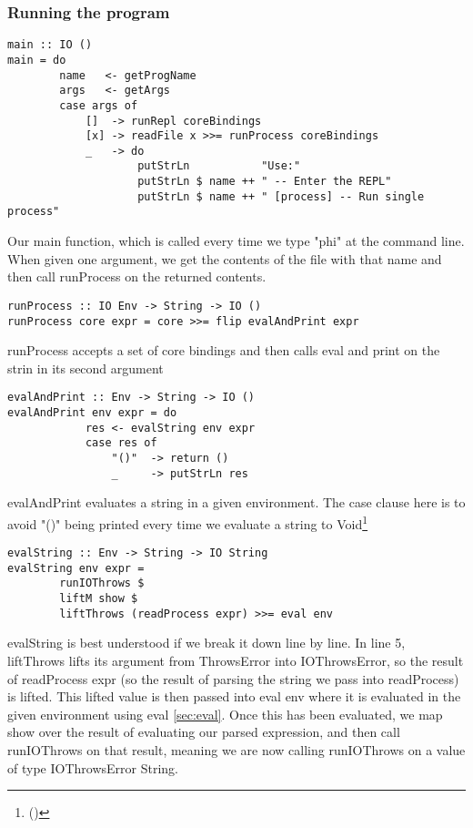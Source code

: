 \subsubsection{Running the program}
\begin{verbatim}
main :: IO ()
main = do
        name   <- getProgName
        args   <- getArgs
        case args of
            []  -> runRepl coreBindings
            [x] -> readFile x >>= runProcess coreBindings 
            _   -> do
                    putStrLn           "Use:"
                    putStrLn $ name ++ " -- Enter the REPL"
                    putStrLn $ name ++ " [process] -- Run single process"
\end{verbatim}

Our main function, which is called every time we type "phi" at the command line. When given one argument, we get the contents of the file with that name and then call runProcess on the returned contents.

\begin{verbatim}
runProcess :: IO Env -> String -> IO ()
runProcess core expr = core >>= flip evalAndPrint expr
\end{verbatim}

runProcess accepts a set of core bindings and then calls eval and print on the strin in its second argument

\begin{verbatim}
evalAndPrint :: Env -> String -> IO ()
evalAndPrint env expr = do
            res <- evalString env expr 
            case res of
                "()"  -> return ()
                _     -> putStrLn res
\end{verbatim}

evalAndPrint evaluates a string in a given environment. The case clause here is to avoid "()" being printed every time we evaluate a string to Void\footnote{()}

\begin{verbatim}
evalString :: Env -> String -> IO String
evalString env expr = 
        runIOThrows $
        liftM show $ 
        liftThrows (readProcess expr) >>= eval env
\end{verbatim}
evalString is best understood if we break it down line by line. In line 5,  liftThrows lifts its argument from ThrowsError into IOThrowsError, so the result of readProcess expr (so the result of parsing the string we pass into readProcess) is lifted. This lifted value is then passed into eval env where it is evaluated in the given environment using eval \ref{sec:eval}.
Once this has been evaluated, we map show over the result of evaluating our parsed expression, and then call runIOThrows on that result, meaning we are now calling runIOThrows on a value of type IOThrowsError String.

